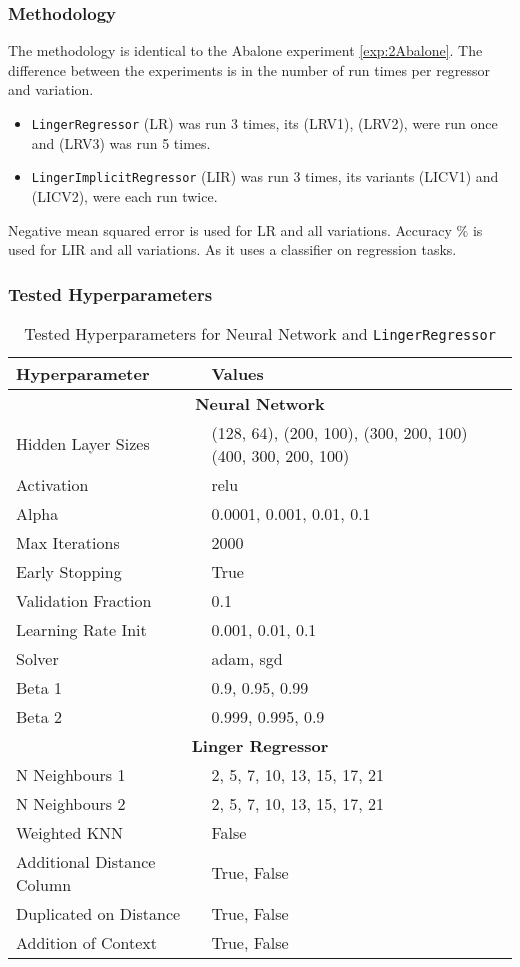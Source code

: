\documentclass[a4paper, 12pt]{report}
\begin{document}
\subsubsection{Methodology}
The methodology is identical to the Abalone experiment \ref{exp:2Abalone}. 
The difference between  the experiments is in the number of run times per regressor and variation.
\begin{itemize}
    \item \texttt{LingerRegressor} (LR) was run 3 times, its (LRV1), (LRV2), were run once and (LRV3) was run 5 times.
    \item \texttt{LingerImplicitRegressor} (LIR) was run 3 times, its variants (LICV1) and (LICV2), were each run twice.
\end{itemize}

Negative mean squared error is used for LR and all variations.
Accuracy $\%$ is used for LIR and all variations. As it uses a classifier on regression tasks.
\subsubsection{Tested Hyperparameters}

\begin{table}[H]
    \centering
    \caption{Tested Hyperparameters for Neural Network and \texttt{LingerRegressor}}
    \label{tab:hyperparameters_abalone}
    \begin{tabular}{|l|l|}
    \hline
    \textbf{Hyperparameter} & \textbf{Values} \\ \hline
    \multicolumn{2}{|c|}{\textbf{Neural Network}} \\ \hline
    Hidden Layer Sizes &  (128, 64), (200, 100), (300, 200, 100) (400, 300, 200, 100)\\ \hline
    Activation & relu \\ \hline
    Alpha & 0.0001, 0.001, 0.01, 0.1 \\ \hline
    Max Iterations & 2000 \\ \hline
    Early Stopping & True \\ \hline
    Validation Fraction & 0.1 \\ \hline
    Learning Rate Init & 0.001, 0.01, 0.1 \\ \hline
    Solver & adam, sgd \\ \hline
    Beta 1 & 0.9, 0.95, 0.99 \\ \hline
    Beta 2 & 0.999, 0.995, 0.9 \\ \hline
    \multicolumn{2}{|c|}{\textbf{Linger Regressor}} \\ \hline
    N Neighbours 1 & 2, 5, 7, 10, 13, 15, 17, 21 \\ \hline
    N Neighbours 2 & 2, 5, 7, 10, 13, 15, 17, 21 \\ \hline
    Weighted KNN & False \\ \hline
    Additional Distance Column & True, False \\ \hline
    Duplicated on Distance & True, False \\ \hline
    Addition of Context & True, False \\ \hline
    \end{tabular}
\end{table}
\clearpage
\end{document}
